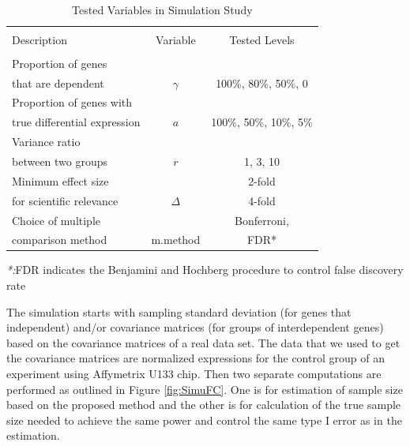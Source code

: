 \documentclass{bioinfo}
\begin{document}
\begin{table}[h]\centering
  \caption{Tested Variables in Simulation Study}\ \\
  \begin{tabular}{lcc}
    \hline\hline
    \\
    Description & Variable & Tested Levels \\
    \\
    \hline\hline
    Proportion of genes & & \\
    that are dependent & $\gamma$ & 100\%, 80\%, 50\%, 0\\
    \hline
    Proportion of genes with & & \\
    true differential expression & $a$ & 100\%, 50\%,
    10\%, 5\% \\
    \hline
    Variance ratio &  &\\
    between two groups & $r$ & 1, 3, 10  \\
    \hline
    Minimum effect size  & &2-fold \\
    for scientific relevance & $\Delta$ & 4-fold \\
    \hline
    Choice of multiple  & & Bonferroni,  \\
    comparison method & m.method & FDR* \\
    \hline\hline
  \end{tabular}
  \emph{*:}FDR indicates the Benjamini and Hochberg procedure to control false discovery rate \label{tb:SimuVariables}
\end{table}

The simulation starts with sampling standard deviation (for genes
that independent) and/or covariance matrices (for groups of
interdependent genes) based on the covariance matrices of a real
data set. The data that we used to get the covariance matrices are
normalized expressions for the control group of an experiment
using Affymetrix U133 chip. Then two separate computations are
performed as outlined in Figure \ref{fig:SimuFC}. One is for
estimation of sample size based on the proposed method and the
other is for calculation of the true sample size needed to achieve
the same power and control the same type I error as in the
estimation.
\end{document}
